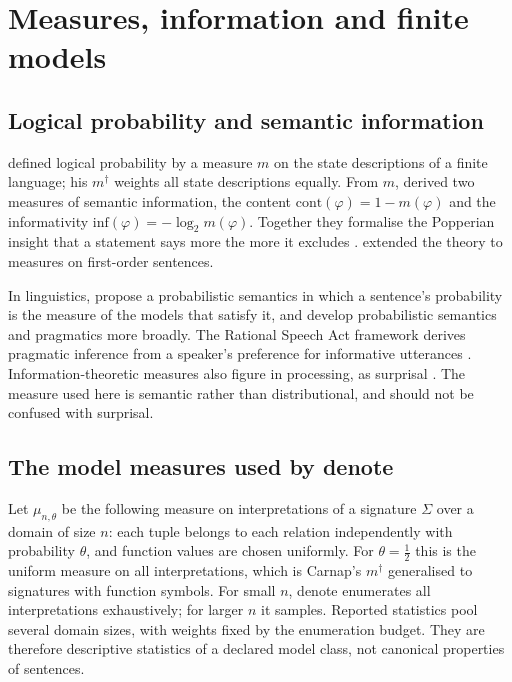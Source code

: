 \documentclass[11pt,a4paper]{article}
\newcommand{\dn}{\textsf{denote}}
\theoremstyle{definition}
\begin{document}
\section{Measures, information and finite models}\label{sec:measure}

\subsection{Logical probability and semantic information}
\citet{carnap1950} defined logical probability by a measure $m$ on the state descriptions of a finite language; his $m^\dagger$ weights all state descriptions equally. From $m$, \citet{carnapbarhillel1952} derived two measures of semantic information, the content $\mathrm{cont}(\varphi)=1-m(\varphi)$ and the informativity $\mathrm{inf}(\varphi)=-\log_2 m(\varphi)$. Together they formalise the Popperian insight that a statement says more the more it excludes \citep{popper1959}. \citet{gaifman1964} extended the theory to measures on first-order sentences.

In linguistics, \citet{vaneijcklappin2012} propose a probabilistic semantics in which a sentence's probability is the measure of the models that satisfy it, and \citet{goodmanlassiter2015} develop probabilistic semantics and pragmatics more broadly. The Rational Speech Act framework derives pragmatic inference from a speaker's preference for informative utterances \citep{frankgoodman2012}. Information-theoretic measures also figure in processing, as surprisal \citep{hale2001,levy2008}. The measure used here is semantic rather than distributional, and should not be confused with surprisal.

\subsection{The model measures used by \texorpdfstring{\dn{}}{denote}}
Let $\mu_{n,\theta}$ be the following measure on interpretations of a signature $\Sigma$ over a domain of size $n$: each tuple belongs to each relation independently with probability $\theta$, and function values are chosen uniformly. For $\theta=\tfrac12$ this is the uniform measure on all interpretations, which is Carnap's $m^\dagger$ generalised to signatures with function symbols. For small $n$, \dn{} enumerates all interpretations exhaustively; for larger $n$ it samples. Reported statistics pool several domain sizes, with weights fixed by the enumeration budget. They are therefore descriptive statistics of a declared model class, not canonical properties of sentences.
\end{document}
